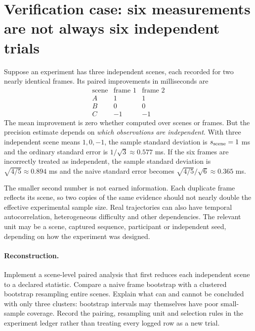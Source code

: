 \clearpage
\section*{Verification case: six measurements are not always six independent trials}
\noindent Suppose an experiment has three independent scenes, each
recorded for two nearly identical frames. Its paired improvements
in milliseconds are
\[
\begin{array}{c|cc}
\text{scene}&\text{frame 1}&\text{frame 2}\\\hline
A&1&1\\B&0&0\\C&-1&-1
\end{array}
\]
The mean improvement is zero whether computed over scenes or frames.
But the precision estimate depends on \emph{which observations are
independent}. With three independent scene means \(1,0,-1\), the
sample standard deviation is \(s_{\rm scene}=1\) ms and the
ordinary standard error is \(1/\sqrt3\approx0.577\) ms.
If the six frames are incorrectly treated as independent, the
sample standard deviation is \(\sqrt{4/5}\approx0.894\) ms and
the naive standard error becomes
\(\sqrt{4/5}/\sqrt6\approx0.365\) ms.

The smaller second number is not earned information. Each duplicate
frame reflects its scene, so two copies of the same evidence should
not nearly double the effective experimental sample size.
Real trajectories can also have temporal autocorrelation,
heterogeneous difficulty and other dependencies. The relevant
unit may be a scene, captured sequence, participant or independent
seed, depending on how the experiment was designed.

\paragraph{Reconstruction.}
Implement a scene-level paired analysis that first reduces each
independent scene to a declared statistic. Compare a naive frame
bootstrap with a clustered bootstrap resampling entire scenes.
Explain what can and cannot be concluded with only three clusters:
bootstrap intervals may themselves have poor small-sample coverage.
Record the pairing, resampling unit and selection rules in the
experiment ledger rather than treating every logged row as a new trial.
